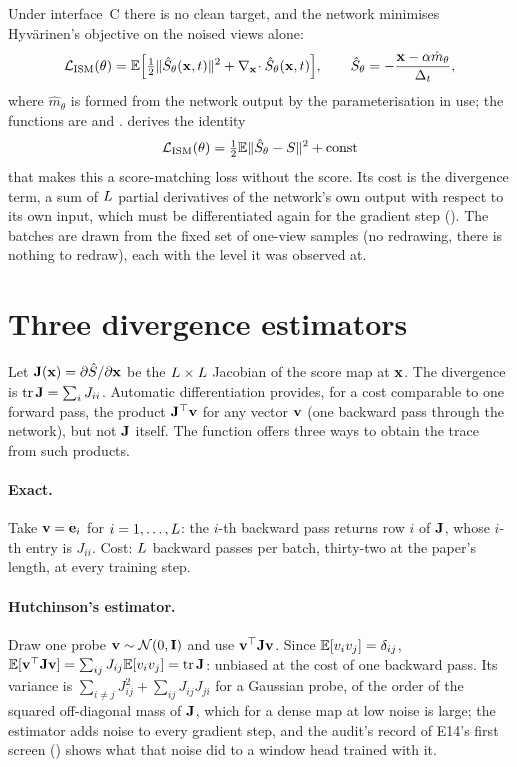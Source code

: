 Under interface~C there is no clean target, and the network minimises Hyv\"arinen's
objective on the noised views alone:
\begin{equation}
  \mathcal L_{\mathrm{ISM}}(\theta)=\mathbb{E}\Bigl[\tfrac12\lVert\hat{S}_\theta(\mathbf{x},t)\rVert^2+\nabla_{\mathbf{x}}\!\cdot\hat{S}_\theta(\mathbf{x},t)\Bigr],
  \qquad
  \hat{S}_\theta=-\frac{\mathbf{x}-\alpha\hat m_\theta}{\Delta_t},
  \label{eq:ism-loss}
\end{equation}
where $\hat m_\theta$ is formed from the network output by the parameterisation in use;
the functions are  and .
 derives the identity
\begin{equation}
  \mathcal L_{\mathrm{ISM}}(\theta)=\tfrac12\mathbb{E}\lVert\hat{S}_\theta-S\rVert^2+\text{const}
\end{equation}
that makes this a score-matching loss without the score. Its cost is the divergence term,
a sum of $L$ partial derivatives of the network's own output with respect to its
own input, which must be differentiated again for the gradient step
(). The batches are drawn from the fixed set of one-view samples
(no redrawing, there is nothing to redraw), each with the level it was observed at.

\section{Three divergence estimators}
\label{sec:divergence}

Let $\mathbf{J}(\mathbf{x})=\partial\hat{S}/\partial\mathbf{x}$ be the $L\times L$ Jacobian of
the score map at $\mathbf{x}$. The divergence is $\operatorname{tr}\mathbf{J}=\sum_iJ_{ii}$. Automatic
differentiation provides, for a cost comparable to one forward pass, the product
$\mathbf{J}^\top\mathbf{v}$ for any vector $\mathbf{v}$ (one backward pass through the network),
but not $\mathbf{J}$ itself. The function  offers three ways to obtain the
trace from such products.

\paragraph{Exact.} Take $\mathbf{v}=\mathbf{e}_i$ for $i=1,\dots,L$: the $i$-th backward
pass returns row $i$ of $\mathbf{J}$, whose $i$-th entry is $J_{ii}$. Cost: $L$
backward passes per batch, thirty-two at the paper's length, at every training step.

\paragraph{Hutchinson's estimator.} Draw one probe $\mathbf{v}\sim\mathcal{N}\!\left(0,\mathbf{I}\right)$ and use
$\mathbf{v}^\top\mathbf{J}\mathbf{v}$. Since $\mathbb{E}[v_iv_j]=\delta_{ij}$,
$\mathbb{E}[\mathbf{v}^\top\mathbf{J}\mathbf{v}]=\sum_{ij}J_{ij}\mathbb{E}[v_iv_j]=\operatorname{tr}\mathbf{J}$: unbiased at the cost
of one backward pass. Its variance is $\sum_{i\ne j}J_{ij}^2+\sum_{ij}J_{ij}J_{ji}$ for a
Gaussian probe, of the order of the squared off-diagonal mass of $\mathbf{J}$, which for a
dense map at low noise is large; the estimator adds noise to every gradient step, and
the audit's record of E14's first screen () shows what that noise did to
a window head trained with it.

